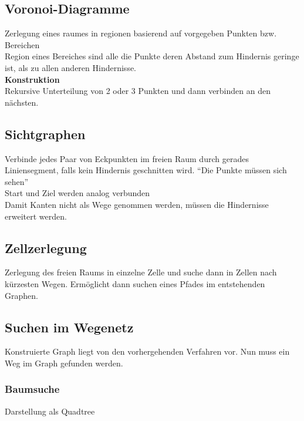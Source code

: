 \subsection{Voronoi-Diagramme}%
\label{bwp:sub:voronoi-diagramme}
Zerlegung eines raumes in regionen basierend auf vorgegeben Punkten bzw. Bereichen\\
Region eines Bereiches sind alle die Punkte deren Abstand zum Hindernis geringe ist, als zu allen anderen Hindernisse.\\

\textbf{Konstruktion}\\
Rekursive Unterteilung von 2 oder 3 Punkten und dann verbinden an den nächsten.


\subsection{Sichtgraphen}%
\label{bwp:sub:sichtgraphen}
Verbinde jedes Paar von Eckpunkten im freien Raum durch gerades Liniensegment, falls kein Hindernis geschnitten wird.
\enquote{Die Punkte müssen sich sehen}\\
Start und Ziel werden analog verbunden\\

Damit Kanten nicht als Wege genommen werden, müssen die Hindernisse erweitert werden.

\subsection{Zellzerlegung}%
\label{bwp:sub:zellzerlegung}
Zerlegung des freien Raums in einzelne Zelle und suche dann in Zellen nach kürzesten Wegen. Ermöglicht dann
suchen eines Pfades im entstehenden Graphen.


\subsection{Suchen im Wegenetz}%
\label{bwp:sub:suchen-im-wegenetz}
Konstruierte Graph liegt von den vorhergehenden Verfahren vor. Nun muss ein Weg im Graph gefunden werden.

\subsubsection{Baumsuche}%
\label{bwp:ssub:baumsuche}
Darstellung als Quadtree

